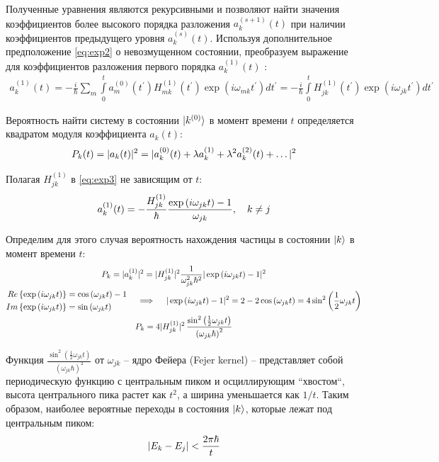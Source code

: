\documentclass[12pt]{article}
\newcommand{\lb}{\left(}
\newcommand{\rb}{\right)}
\newcommand{\vverh}{\vspace*{-0.15cm}}
\begin{document}
Полученные уравнения являются рекурсивными и позволяют найти значения коэффициентов более высокого порядка разложения $a_k^{(s + 1)}(t)$ при наличии коэффициентов предыдущего уровня $a_k^{(s)}(t)$. Используя дополнительное предположение \eqref{eq:exp2} о невозмущенном состоянии, преобразуем выражение для коэффициентов разложения первого порядка $a_k^{(1)}(t)$ :
\vverh
\begin{gather}
	a_k^{(1)}(t) = - \frac{i}{\hbar} \sum_m \int\limits_{0}^{t} a_m^{(0)} (t^\prime) H_{mk}^{(1)} (t^\prime) \exp \lb i \omega_{mk} t^\prime \rb d t^\prime = - \frac{i}{\hbar} \int\limits_0^t H_{jk}^{(1)}(t^\prime) \exp \lb i \omega_{jk} t^\prime \rb d t^\prime \label{eq:exp3}
\end{gather}

Вероятность найти систему в состоянии $\ket{k^{(0)}}$ в момент времени $t$ определяется квадратом модуля коэффициента $a_k(t)$:
\vverh
\begin{gather}
	P_{k}(t) = | a_k(t) |^2  = | a_k^{(0)}(t) + \lambda a_k^{(1)} + \lambda^2 a_k^{(2)}(t) + \dots |^2 \notag
\end{gather}

Полагая $ H_{jk}^{(1)}$ в \eqref{eq:exp3} не зависящим от $t$:
\vverh
\begin{gather}
	a_k^{(1)}(t) = - \frac{H_{jk}^{(1)}}{\hbar} \frac{\exp \lb i \omega_{jk} t \rb - 1}{\omega_{jk}}, \quad k \neq j \notag
\end{gather}

Определим для этого случая вероятность нахождения частицы в состоянии $\ket{k}$ в момент времени $t$:
\vverh
\begin{gather}
	P_k = |a _k^{(1)} |^2 = | H_{jk}^{(1)} |^2 \frac{1}{\omega_{jk}^2 \hbar^2} | \exp \lb i \omega_{jk} t \rb - 1 |^2 \notag \\
	\begin{aligned}
		Re \left\{ \exp \lb i \omega_{jk} t \rb \right\} &= \cos \lb \omega_{jk} t \rb - 1 \\
		Im \left\{ \exp \lb i \omega_{jk} t \rb \right\} &= \sin \lb \omega_{jk} t \rb 
	\end{aligned} \quad \implies \quad
	| \exp \lb i \omega_{jk} t \rb - 1 |^2 = 2 - 2 \cos \lb \omega_{jk} t \rb = 4 \sin^2 \lb \frac{1}{2} \omega_{jk} t \rb \notag \\
	P_k = 4 | H_{jk}^{(1)} |^2  \, \frac{\sin^2 \lb \frac{1}{2} \omega_{jk} t \rb}{\lb \omega_{jk} \hbar \rb^2} \notag
\end{gather} 

Функция $\displaystyle \frac{\sin^2 \lb \frac{1}{2} \omega_{jk} t \rb}{\lb \omega_{jk} \hbar \rb^2}$ от $\omega_{jk}$ -- ядро Фейера (Fejer kernel) -- представляет собой периодическую функцию с центральным пиком и осциллирующим ``хвостом``, высота центрального пика растет как $t^2$, а ширина уменьшается как $1 / t$. Таким образом, наиболее вероятные переходы в состояния $\ket{k}$, которые лежат под центральным пиком: 
\vverh
\begin{gather}
	| E_k - E_j | < \frac{2 \pi \hbar}{t} \notag
\end{gather}
\end{document}
